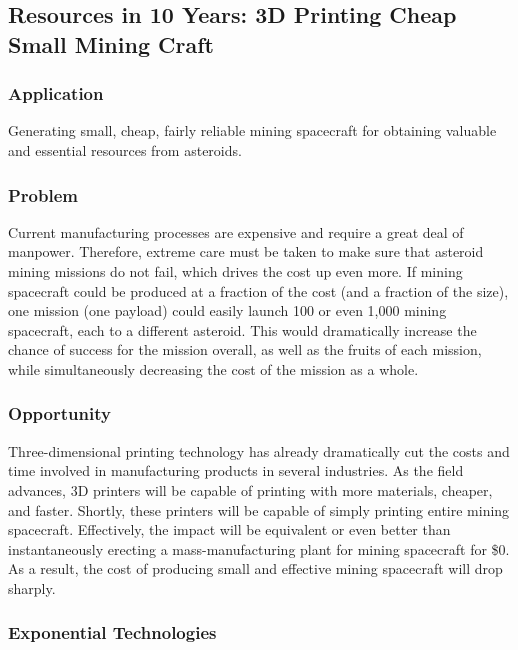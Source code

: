 \documentclass[english]{article}
\begin{document}
\subsection{Resources in 10 Years: 3D Printing Cheap Small Mining Craft}


\subsubsection{Application}

Generating small, cheap, fairly reliable mining spacecraft for obtaining
valuable and essential resources from asteroids.


\subsubsection{Problem}

Current manufacturing processes are expensive and require a great
deal of manpower. Therefore, extreme care must be taken to make sure
that asteroid mining missions do not fail, which drives the cost up
even more. If mining spacecraft could be produced at a fraction of
the cost (and a fraction of the size), one mission (one payload) could
easily launch 100 or even 1,000 mining spacecraft, each to a different
asteroid. This would dramatically increase the chance of success for
the mission overall, as well as the fruits of each mission, while
simultaneously decreasing the cost of the mission as a whole.


\subsubsection{Opportunity}

Three-dimensional printing technology has already dramatically cut
the costs and time involved in manufacturing products in several industries.
As the field advances, 3D printers will be capable of printing with
more materials, cheaper, and faster. Shortly, these printers will
be capable of simply printing entire mining spacecraft. Effectively,
the impact will be equivalent or even better than instantaneously
erecting a mass-manufacturing plant for mining spacecraft for \$0.
As a result, the cost of producing small and effective mining spacecraft
will drop sharply.


\subsubsection{Exponential Technologies}
\end{document}
